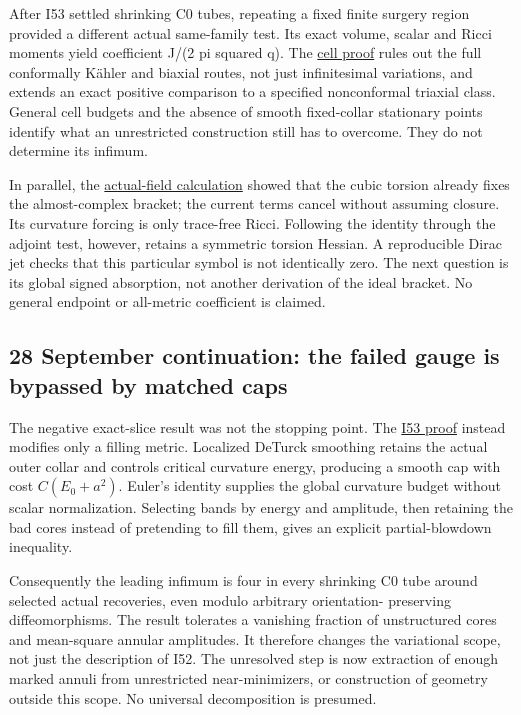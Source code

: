 \documentclass[
  10pt,
]{article}
\begin{document}
After I53 settled shrinking C0 tubes, repeating a fixed finite surgery
region provided a different actual same-family test. Its exact volume,
scalar and Ricci moments yield coefficient J/(2 pi squared q). The
\href{../continuation/20260928_relative_cell_cost.md}{cell proof} rules
out the full conformally Kähler and biaxial routes, not just
infinitesimal variations, and extends an exact positive comparison to a
specified nonconformal triaxial class. General cell budgets and the
absence of smooth fixed-collar stationary points identify what an
unrestricted construction still has to overcome. They do not determine
its infimum.

In parallel, the
\href{../continuation/20260928_actual_torsion_prolongation.md}{actual-field
calculation} showed that the cubic torsion already fixes the
almost-complex bracket; the current terms cancel without assuming
closure. Its curvature forcing is only trace-free Ricci. Following the
identity through the adjoint test, however, retains a symmetric torsion
Hessian. A reproducible Dirac jet checks that this particular symbol is
not identically zero. The next question is its global signed absorption,
not another derivation of the ideal bracket. No general endpoint or
all-metric coefficient is claimed.

\hypertarget{september-continuation-the-failed-gauge-is-bypassed-by-matched-caps}{%
\subsection{28 September continuation: the failed gauge is bypassed by
matched
caps}\label{september-continuation-the-failed-gauge-is-bypassed-by-matched-caps}}

The negative exact-slice result was not the stopping point. The
\href{../continuation/20260928_intrinsic_caps_and_stability.md}{I53
proof} instead modifies only a filling metric. Localized DeTurck
smoothing retains the actual outer collar and controls critical
curvature energy, producing a smooth cap with cost \(C(E_0+a^2)\).
Euler's identity supplies the global curvature budget without scalar
normalization. Selecting bands by energy and amplitude, then retaining
the bad cores instead of pretending to fill them, gives an explicit
partial-blowdown inequality.

Consequently the leading infimum is four in every shrinking C0 tube
around selected actual recoveries, even modulo arbitrary orientation-
preserving diffeomorphisms. The result tolerates a vanishing fraction of
unstructured cores and mean-square annular amplitudes. It therefore
changes the variational scope, not just the description of I52. The
unresolved step is now extraction of enough marked annuli from
unrestricted near-minimizers, or construction of geometry outside this
scope. No universal decomposition is presumed.
\end{document}
